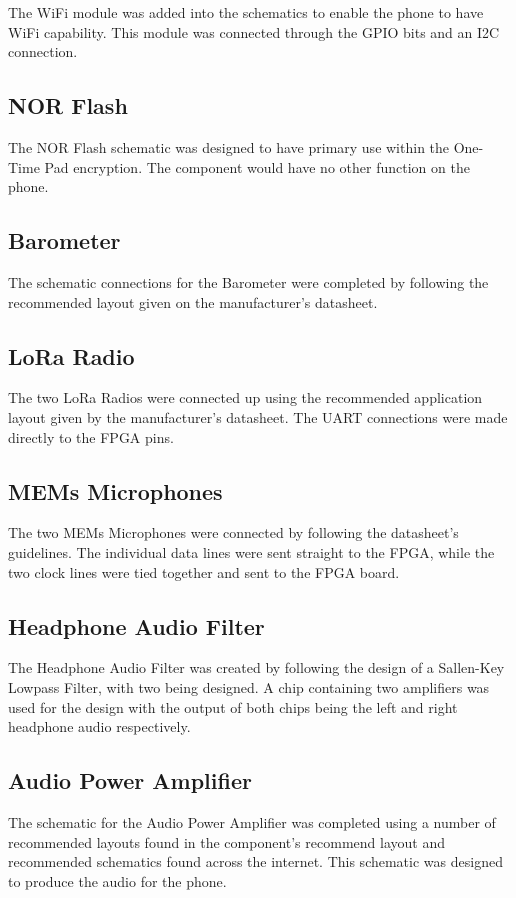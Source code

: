 	The WiFi module was added into the schematics to enable the phone to have WiFi capability. This module was connected through the GPIO bits and an I2C connection.

\subsection{NOR Flash}

	The NOR Flash schematic was designed to have primary use within the One-Time Pad encryption. The component would have no other function on the phone. 

\subsection{Barometer}

	The schematic connections for the Barometer were completed by following the recommended layout given on the manufacturer's datasheet. 

\subsection{LoRa Radio}

	The two LoRa Radios were connected up using the recommended application layout given by the manufacturer's datasheet. The UART connections were made directly to the FPGA pins.

\subsection{MEMs Microphones}
\label{chap:mics}
	The two MEMs Microphones were connected by following the datasheet's guidelines. The individual data lines were sent straight to the FPGA, while the two clock lines were tied together and sent to the FPGA board. 

\subsection{Headphone Audio Filter} 
\label{chap:audio2}
	The Headphone Audio Filter was created by following the design of a Sallen-Key Lowpass Filter, with two being designed. A chip containing two amplifiers was used for the design with the output of both chips being the left and right headphone audio respectively. 

\subsection{Audio Power Amplifier}
\label{chap:audio}
	The schematic for the Audio Power Amplifier was completed using a number of recommended layouts found in the component's recommend layout and recommended schematics found across the internet. This schematic was designed to produce the audio for the phone. 

